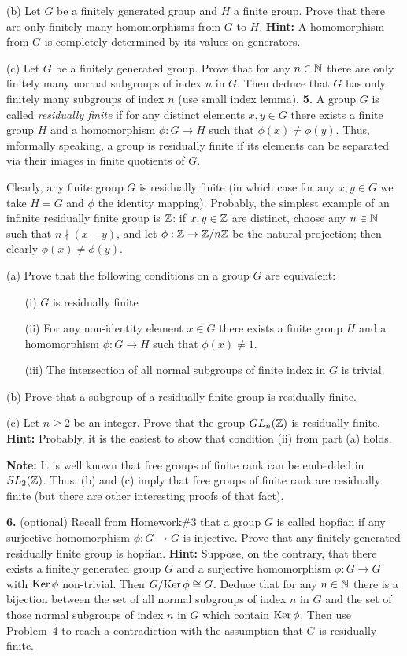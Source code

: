 \documentclass[12pt]{article}
\begin{document}
(b) Let $G$ be a finitely generated group and $H$ a finite group. Prove that
there are only finitely many homomorphisms from $G$ to $H$. {\bf Hint:}
A homomorphism from $G$ is completely determined by its values on generators.

(c) Let $G$ be a finitely generated group. Prove that for any $n\in{\mathbb N}$
there are only finitely many normal subgroups of index $n$ in $G$. Then deduce that
$G$ has only finitely many subgroups of index $n$ (use small index lemma).
\skv
{\bf 5.} A group $G$ is called {\it residually finite} if for any distinct elements $x,y\in G$
there exists a finite group $H$ and a homomorphism $\phi: G\to H$ such that $\phi(x)\neq \phi(y)$.
Thus, informally speaking, a group is residually finite if its elements can be separated
via their images in finite quotients of $G$.

Clearly, any finite group $G$ is residually finite (in which case for any $x,y\in G$
we take $H=G$ and $\phi$ the identity mapping). Probably, the simplest example
of an infinite residually finite group is ${\mathbb Z}$: if $x,y\in{\mathbb Z}$ are distinct,
choose any $n\in{\mathbb N}$ such that $n\nmid (x-y)$, and let $\phi:{\mathbb Z}\to{\mathbb Z}/n{\mathbb Z}$
be the natural projection; then clearly $\phi(x)\neq \phi(y)$.

(a) Prove that the following conditions on a group $G$ are equivalent:
\begin{itemize}
\item[(i)] $G$ is residually finite
\item[(ii)] For any non-identity element $x\in G$ there exists a finite group $H$
and a homomorphism $\phi: G\to H$ such that $\phi(x)\neq 1$.
\item[(iii)] The intersection of all normal subgroups of finite index in $G$ is trivial.
\end{itemize}

(b) Prove that a subgroup of a residually finite group is residually finite.

(c) Let $n\geq 2$ be an integer. Prove that the group $GL_n({\mathbb Z})$ is residually finite.
{\bf Hint: }Probably, it is the easiest to show that condition (ii) from part (a) holds.

{\bf Note: } It is well known that free groups of finite rank can be embedded in
$SL_2({\mathbb Z})$. Thus, (b) and (c) imply that free groups of finite rank are residually finite
(but there are other interesting proofs of that fact).

\skv
{\bf 6.} (optional) Recall from Homework\#3 that a group $G$ is called hopfian if any surjective
homomorphism $\phi: G\to G$ is injective. Prove that any finitely generated residually finite
group is hopfian. {\bf Hint:} Suppose, on the contrary, that there exists a finitely
generated group $G$ and a surjective homomorphism $\phi:G\to G$ with ${\rm Ker\,}\phi$ non-trivial.
Then $G/{\rm Ker\,}\phi\cong G$. Deduce that for any $n\in{\mathbb N}$ there is a bijection between
the set of all normal subgroups of index $n$ in $G$ and the set of those normal subgroups of index
$n$ in $G$ which contain ${\rm Ker\,}\phi$. Then use Problem~4 to reach a contradiction
with the assumption that $G$ is residually finite.
\end{document}
